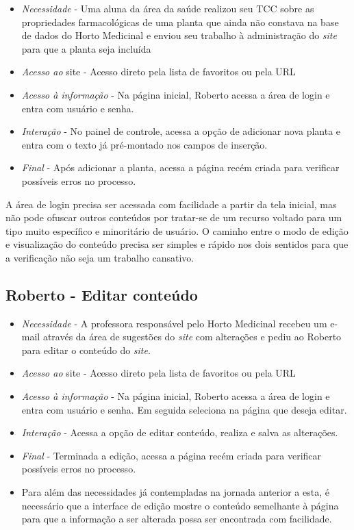 \begin{itemize}
\item
  \emph{Necessidade} - Uma aluna da área da saúde realizou seu TCC sobre as propriedades farmacológicas de uma planta que ainda não constava na base de dados do Horto Medicinal e enviou seu trabalho à administração do \emph{site} para que a planta seja incluída
\item
  \emph{Acesso ao} site - Acesso direto pela lista de favoritos ou pela URL
\item
  \emph{Acesso à informação} - Na página inicial, Roberto acessa a área de login e entra com usuário e senha.
\item
  \emph{Interação} - No painel de controle, acessa a opção de adicionar nova planta e entra com o texto já pré-montado nos campos de inserção.
\item
  \emph{Final} - Após adicionar a planta, acessa a página recém criada para verificar possíveis erros no processo.
\end{itemize}

A área de login precisa ser acessada com facilidade a partir da tela inicial, mas não pode ofuscar outros conteúdos por tratar-se de um recurso voltado para um tipo muito específico e minoritário de usuário. O caminho entre o modo de edição e visualização do conteúdo precisa ser simples e rápido nos dois sentidos para que a verificação não seja um trabalho cansativo.

\subsection{Roberto - Editar conteúdo}\label{roberto---editar-conteudo}

\begin{itemize}
\item
  \emph{Necessidade} - A professora responsável pelo Horto Medicinal recebeu um e-mail através da área de sugestões do \emph{site} com alterações e pediu ao Roberto para editar o conteúdo do \emph{site}.
\item
  \emph{Acesso ao} site - Acesso direto pela lista de favoritos ou pela URL
\item
  \emph{Acesso à informação} - Na página inicial, Roberto acessa a área de login e entra com usuário e senha. Em seguida seleciona na página que deseja editar.
\item
  \emph{Interação} - Acessa a opção de editar conteúdo, realiza e salva as alterações.
\item
  \emph{Final} - Terminada a edição, acessa a página recém criada para verificar possíveis erros no processo.
\item
  Para além das necessidades já contempladas na jornada anterior a esta, é necessário que a interface de edição mostre o conteúdo semelhante à página para que a informação a ser alterada possa ser encontrada com facilidade.
\end{itemize}

